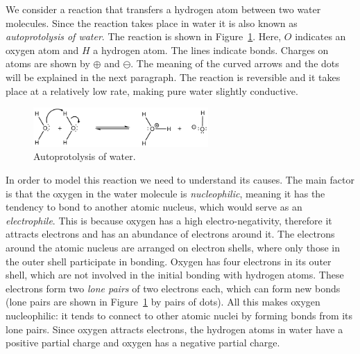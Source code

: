 \documentclass[runningheads]{llncs}
\begin{document}
We consider a reaction that transfers a hydrogen atom between two water molecules. Since the
reaction takes place in water it is also known as \emph{autoprotolysis of water}. The reaction is shown 
in Figure~\ref{fig:autoprotolysis}. Here, $O$ indicates an oxygen atom and $H$ a hydrogen atom. The lines indicate bonds. Charges on atoms are shown by $\oplus$ and $\ominus$. The meaning of the curved arrows and the dots will be explained in the next paragraph. The reaction is reversible and it takes place at a relatively 
low rate, making pure water slightly conductive.

\begin{figure}
\centering
\includegraphics[height=1.5cm]{autoprotolysis_corr3}
\caption{Autoprotolysis of water.}
\label{fig:autoprotolysis}
\end{figure}

In order to model this reaction we need to understand its causes. %
The main factor is that the oxygen in the water molecule is \emph{nucleophilic}, meaning it has the tendency to bond to another atomic nucleus, which would serve as an \emph{electrophile}. This is because oxygen has a high 
electro-negativity, therefore it attracts electrons and has an abundance of electrons around it. The electrons around the atomic nucleus are arranged on electron shells, where only those in the outer shell participate in bonding. Oxygen has four electrons in its outer shell, which are not involved in the initial bonding with hydrogen atoms. These electrons form two \emph{lone pairs} of two electrons each, which can form new bonds (lone pairs are shown in Figure~\ref{fig:autoprotolysis} by pairs of dots). All this makes oxygen nucleophilic: it tends to connect 
to other atomic nuclei by forming bonds from its lone pairs. Since oxygen attracts electrons, the hydrogen atoms in water
have a positive partial charge and oxygen has a negative partial charge. 
\end{document}
